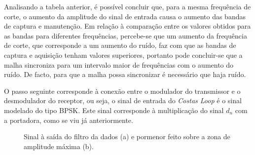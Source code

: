 \documentclass[11pt]{article}
\numberwithin{equation}{section}
\begin{document}
Analisando a tabela anterior, é possível concluir que, para a mesma frequência de corte, o aumento da amplitude do sinal de entrada causa o aumento das bandas de captura e manutenção. Em relação à comparação entre os valores obtidos para as bandas para diferentes frequências, percebe-se que um aumento da frequência de corte, que corresponde a um aumento do ruído, faz com que as bandas de captura e aquisição tenham valores superiores, portanto pode concluir-se que a malha sincroniza para um intervalo maior de frequências com o aumento do ruído. De facto, para que a malha possa sincronizar é necessário que haja ruído.

O passo seguinte corresponde à conexão entre o modulador do transmissor e o desmodulador do receptor, ou seja, o sinal de entrada do \textit{Costas Loop} é o sinal modelado do tipo BPSK. Este sinal corresponde à multiplicação do sinal $d_n$ com a portadora, como se viu já anteriormente.


\begin{figure}[H]
	\centering
	\hspace{8mm}
	\vspace{-0.8em}
	\caption{Sinal à saída do filtro da dados (a) e pormenor feito sobre a zona de amplitude máxima (b).}
	\label{fig:out1}
	\vspace{-0.8em}
\end{figure}
\end{document}

